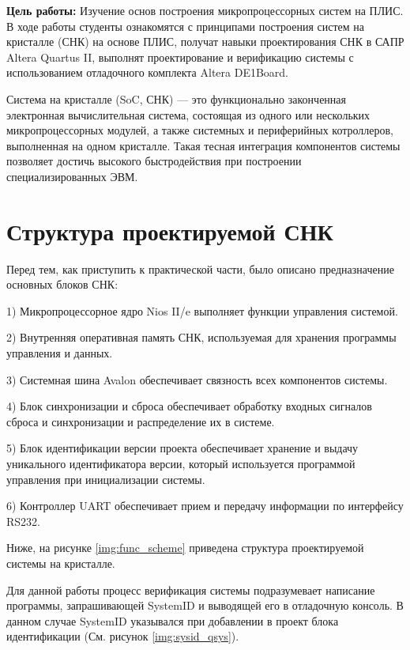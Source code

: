 \textbf{Цель работы:} Изучение основ построения микропроцессорных систем на ПЛИС. В ходе работы студенты ознакомятся с принципами построения систем на кристалле (СНК) на основе ПЛИС, получат навыки проектирования СНК в САПР Altera Quartus II, выполнят проектирование и верификацию системы с использованием отладочного комплекта Altera DE1Board.

Система на кристалле (SoC, СНК) --- это функционально законченная электронная вычислительная система, состоящая из одного или нескольких микропроцессорных модулей, а также системных и периферийных котроллеров, выполненная на одном кристалле. Такая
тесная интеграция компонентов системы позволяет достичь высокого быстродействия при
построении специализированных ЭВМ.

\newpage

\section{Структура проектируемой СНК}

Перед тем, как приступить к практической части, было описано предназначение основных блоков СНК:

1) Микропроцессорное ядро Nios II/e выполняет функции управления системой.

2) Внутренняя оперативная память СНК, используемая для хранения программы управления и данных.

3) Системная шина Avalon обеспечивает связность всех компонентов системы. 

4) Блок синхронизации и сброса обеспечивает обработку входных сигналов сброса и синхронизации и распределение их в системе.

5) Блок идентификации версии проекта обеспечивает хранение и выдачу уникального идентификатора версии, который используется программой управления при инициализации системы.	

6) Контроллер UART обеспечивает прием и передачу информации по интерфейсу RS232.

Ниже, на рисунке \ref{img:func_scheme} приведена структура проектируемой системы на кристалле.


Для данной работы процесс верификация системы подразумевает написание программы, запрашивающей SystemID и выводящей его в отладочную консоль. В данном случае SystemID указывался при добавлении в проект блока идентификации (См. рисунок \ref{img:sysid_qsys}). 

